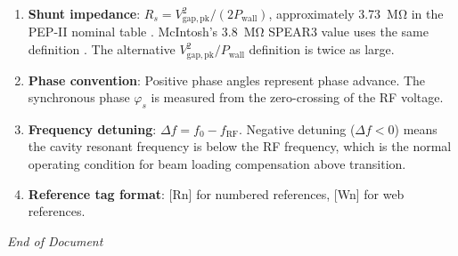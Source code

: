 \begin{enumerate}
\def\labelenumi{\arabic{enumi}.}
\item
  \textbf{Shunt impedance}: $R_s=V_{\mathrm{gap,pk}}^2/(2P_{\mathrm{wall}})$, approximately \qty{3.73}{\mega\ohm} in the PEP-II nominal table . McIntosh's \qty{3.8}{\mega\ohm} SPEAR3 value uses the same definition . The alternative $V_{\mathrm{gap,pk}}^2/P_{\mathrm{wall}}$ definition is twice as large. 
\item
  \textbf{Phase convention}: Positive phase angles represent phase advance. The synchronous phase $\varphi_s$ is measured from the zero-crossing of the RF voltage.
\item
  \textbf{Frequency detuning}: $\Delta f = f_0 - f_\text{RF}$. Negative detuning ($\Delta f < 0$) means the cavity resonant frequency is below the RF frequency, which is the normal operating condition for beam loading compensation above transition.
\item
  \textbf{Reference tag format}: {[}Rn{]} for numbered references, {[}Wn{]} for web references.

\end{enumerate}



\emph{End of Document}



